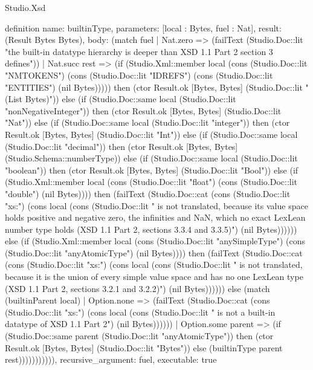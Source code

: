 \begin{lexlean}{Studio.Xsd}
\begin{semanticmodule}
definition{
  name: builtinType,
  parameters: [local : Bytes, fuel : Nat],
  result: (Result Bytes Bytes),
  body: (match fuel
    | Nat.zero => (failText (Studio.Doc::lit "the built-in datatype hierarchy is deeper than XSD 1.1 Part 2 section 3 defines"))
    | Nat.succ rest => (if (Studio.Xml::member local (cons (Studio.Doc::lit "NMTOKENS") (cons (Studio.Doc::lit "IDREFS") (cons (Studio.Doc::lit "ENTITIES") (nil Bytes))))) then (ctor Result.ok [Bytes, Bytes] (Studio.Doc::lit "(List Bytes)")) else (if (Studio.Doc::same local (Studio.Doc::lit "nonNegativeInteger")) then (ctor Result.ok [Bytes, Bytes] (Studio.Doc::lit "Nat")) else (if (Studio.Doc::same local (Studio.Doc::lit "integer")) then (ctor Result.ok [Bytes, Bytes] (Studio.Doc::lit "Int")) else (if (Studio.Doc::same local (Studio.Doc::lit "decimal")) then (ctor Result.ok [Bytes, Bytes] (Studio.Schema::numberType)) else (if (Studio.Doc::same local (Studio.Doc::lit "boolean")) then (ctor Result.ok [Bytes, Bytes] (Studio.Doc::lit "Bool")) else (if (Studio.Xml::member local (cons (Studio.Doc::lit "float") (cons (Studio.Doc::lit "double") (nil Bytes)))) then (failText (Studio.Doc::cat (cons (Studio.Doc::lit "xs:") (cons local (cons (Studio.Doc::lit " is not translated, because its value space holds positive and negative zero, the infinities and NaN, which no exact LexLean number type holds (XSD 1.1 Part 2, sections 3.3.4 and 3.3.5)") (nil Bytes)))))) else (if (Studio.Xml::member local (cons (Studio.Doc::lit "anySimpleType") (cons (Studio.Doc::lit "anyAtomicType") (nil Bytes)))) then (failText (Studio.Doc::cat (cons (Studio.Doc::lit "xs:") (cons local (cons (Studio.Doc::lit " is not translated, because it is the union of every simple value space and has no one LexLean type (XSD 1.1 Part 2, sections 3.2.1 and 3.2.2)") (nil Bytes)))))) else (match (builtinParent local)
      | Option.none => (failText (Studio.Doc::cat (cons (Studio.Doc::lit "xs:") (cons local (cons (Studio.Doc::lit " is not a built-in datatype of XSD 1.1 Part 2") (nil Bytes))))))
      | Option.some parent => (if (Studio.Doc::same parent (Studio.Doc::lit "anyAtomicType")) then (ctor Result.ok [Bytes, Bytes] (Studio.Doc::lit "Bytes")) else (builtinType parent rest))))))))))),
  recursive_argument: fuel,
  executable: true
}


\end{semanticmodule}
\end{lexlean}

